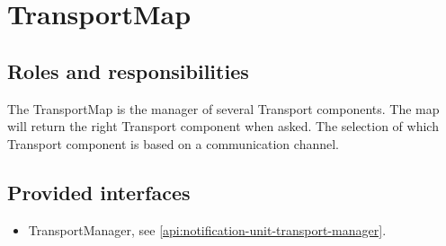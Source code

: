 \section{TransportMap}
\label{element:transport-map}

\subsection{Roles and responsibilities}

\npar The TransportMap is the manager of several Transport components. The
map will return the right Transport component when asked. The selection of
which Transport component is based on a communication channel.

\subsection{Provided interfaces}

\begin{itemize}
  \item TransportManager, see \ref{api:notification-unit-transport-manager}.
\end{itemize}